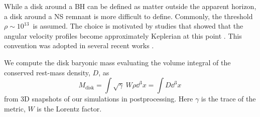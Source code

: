 

While a disk around a \ac{BH} can be defined as matter outside the apparent 
horizon, a disk around a \ac{NS} remnant is more difficult to define. Commonly, the 
threshold $\rho\sim 10^{13}\,$\gcm{} is assumed. The choice is motivated by studies that 
showed that the angular velocity profiles become approximately Keplerian at this point 
\citep[\eg][]{Shibata:2005ss,Shibata:2006nm,Hanauske:2016gia,Kastaun:2016elu}.
This convention was adopted in several recent works 
\citep{Radice:2018pdn,Kiuchi:2019lls,Vincent:2019kor}.
%
%
%


We compute the disk baryonic mass evaluating
the volume integral of the conserved rest-mass density, $D$, as 
%
\begin{equation}
\label{eq:method:mdisk}
M_{\text{disk}} = \int \sqrt{\gamma}~W\rho \dd^3 x  = \int D \dd^3 x\, 
\end{equation}
%
from $3$D snapshots of our simulations in postprocessing.
%
Here $\gamma$ is the trace of the metric, $W$ is the Lorentz factor. 


